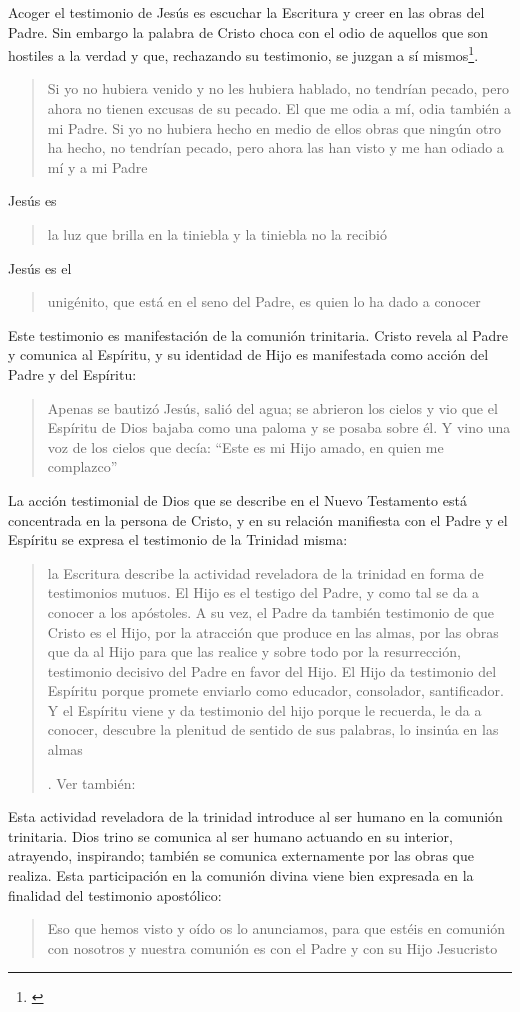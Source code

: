 Acoger el testimonio de Jesús es escuchar la Escritura y creer en las obras del Padre. Sin embargo la palabra de Cristo choca con el odio de aquellos que son hostiles a la verdad y que, rechazando su testimonio, se juzgan a sí mismos\footnote{\cite[Cf.~][1530]{latourelle2000testimonio}
}. \blockquote[][\,(Jn 15,22-24)]{Si yo no hubiera venido y no les hubiera hablado, no tendrían pecado, pero ahora no tienen excusas de su pecado. El que me odia a mí, odia también a mi Padre. Si yo no hubiera hecho en medio de ellos obras que ningún otro ha hecho, no tendrían pecado, pero ahora las han visto y me han odiado a mí y a mi Padre}.

Jesús es \blockquote[][\,(Jn 1,5)]{la luz que brilla en la tiniebla y la tiniebla no la recibió}. Jesús es el \blockquote[][\,(Jn 1,18)]{unigénito, que está en el seno del Padre, es quien lo ha dado a conocer}. Este testimonio es manifestación de la comunión trinitaria. Cristo revela al Padre y comunica al Espíritu, y su identidad de Hijo es manifestada como acción del Padre y del Espíritu: \blockquote[][\,(Mt 4,16-17)]{Apenas se bautizó Jesús, salió del agua; se abrieron los cielos y vio que el Espíritu de Dios bajaba como una paloma y se posaba sobre él. Y vino una voz de los cielos que decía: ``Este es mi Hijo amado, en quien me complazco''}.

La acción testimonial de Dios que se describe en el Nuevo Testamento está concentrada en la persona de Cristo, y en su relación manifiesta con el Padre y el Espíritu se expresa el testimonio de la Trinidad misma: \blockquote[{\cite[410]{latourelle1999rev}}. Ver también: {\cite[131]{prades2015testimonio}}]{la Escritura describe la actividad reveladora de la trinidad en forma de testimonios mutuos. El Hijo es el testigo del Padre, y como tal se da a conocer a los apóstoles. A su vez, el Padre da también testimonio de que Cristo es el Hijo, por la atracción que produce en las almas, por las obras que da al Hijo para que las realice y sobre todo por la resurrección, testimonio decisivo del Padre en favor del Hijo. El Hijo da testimonio del Espíritu porque promete enviarlo como educador, consolador, santificador. Y el Espíritu viene y da testimonio del hijo porque le recuerda, le da a conocer, descubre la plenitud de sentido de sus palabras, lo insinúa en las almas}. Esta actividad reveladora de la trinidad introduce al ser humano en la comunión trinitaria. Dios trino se comunica al ser humano actuando en su interior, atrayendo, inspirando; también se comunica externamente por las obras que realiza. Esta participación en la comunión divina viene bien expresada en la finalidad del testimonio apostólico: \blockquote[][\,(1Jn 1,3)]{Eso que hemos visto y oído os lo anunciamos, para que estéis en comunión con nosotros y nuestra comunión es con el Padre y con su Hijo Jesucristo}.

